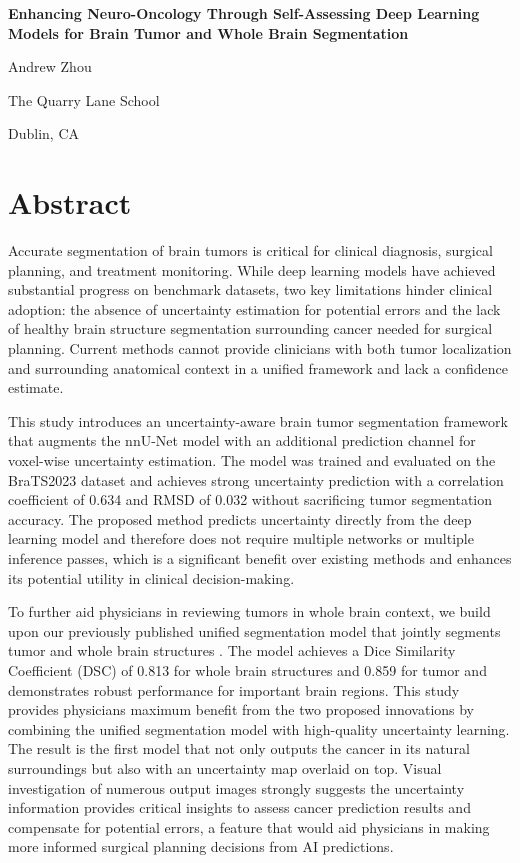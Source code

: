 \documentclass[11pt,letterpaper]{article}
\begin{document}
\begin{titlepage}
\centering
\vspace*{2in}
{\LARGE\bfseries Enhancing Neuro-Oncology Through Self-Assessing Deep Learning Models for Brain Tumor and Whole Brain Segmentation\par}
\vspace{2in}
{\large Andrew Zhou\par}
{\large The Quarry Lane School\par}
{\large Dublin, CA\par}
\vfill
\end{titlepage}
\thispagestyle{empty}

\section*{Abstract}
Accurate segmentation of brain tumors is critical for clinical diagnosis, surgical planning, and treatment monitoring. While deep learning models have achieved substantial progress on benchmark datasets, two key limitations hinder clinical adoption: the absence of uncertainty estimation for potential errors and the lack of healthy brain structure segmentation surrounding cancer needed for surgical planning. Current methods cannot provide clinicians with both tumor localization and surrounding anatomical context in a unified framework and lack a confidence estimate.

This study introduces an uncertainty-aware brain tumor segmentation framework that augments the nnU-Net model \cite{nnUnet} with an additional prediction channel for voxel-wise uncertainty estimation. The model was trained and evaluated on the BraTS2023 dataset \cite{BraTS2023} and achieves strong uncertainty prediction with a correlation coefficient of 0.634 and RMSD of 0.032 without sacrificing tumor segmentation accuracy. The proposed method predicts uncertainty directly from the deep learning model and therefore does not require multiple networks or multiple inference passes, which is a significant benefit over existing methods and enhances its potential utility in clinical decision-making. 

To further aid physicians in reviewing tumors in whole brain context, we build upon our previously published unified segmentation model that jointly segments tumor and whole brain structures \cite{zhou2025unified}. The model achieves a Dice Similarity Coefficient (DSC) of 0.813 for whole brain structures and 0.859 for tumor and demonstrates robust performance for important brain regions. This study provides physicians maximum benefit from the two proposed innovations by combining the unified segmentation model with high-quality uncertainty learning. The result is the first model that not only outputs the cancer in its natural surroundings but also with an uncertainty map overlaid on top. Visual investigation of numerous output images strongly suggests the uncertainty information provides critical insights to assess cancer prediction results and compensate for potential errors, a feature that would aid physicians in making more informed surgical planning decisions from AI predictions.
\end{document}

